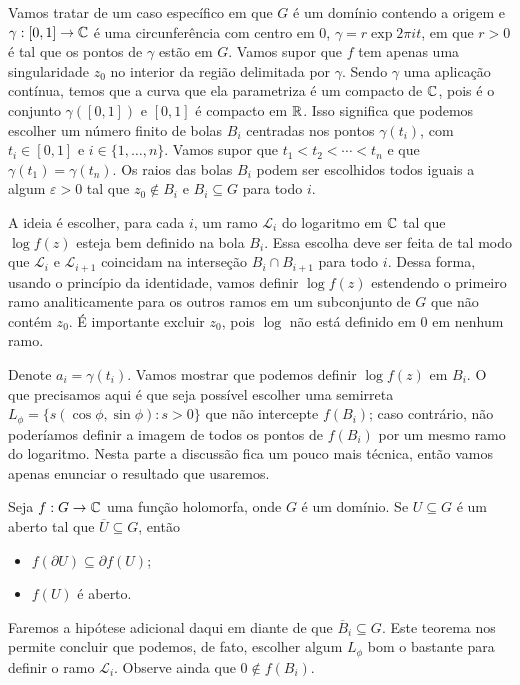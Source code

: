 Vamos tratar de um caso específico em que $G$ é um domínio contendo a origem e 
$\gamma: [0,1] \to \mathbb{C}$ é uma circunferência com centro em $0$, $\gamma = r\exp{2 \pi i t}$, 
em que $r > 0$ é tal que os pontos de $\gamma$ estão em $G$. Vamos supor que $f$ tem apenas 
uma singularidade $z_0$ no interior da região delimitada por $\gamma$. Sendo $\gamma$ uma
aplicação contínua, temos que a curva que ela parametriza é um compacto de $\mathbb{C}$, pois é o
conjunto $\gamma([0,1])$ e $[0,1]$ é compacto em $\mathbb{R}$. Isso significa que podemos escolher um
número finito de bolas $B_i$ centradas nos pontos $\gamma(t_i)$, com $t_i \in [0,1]$ e 
$i \in \{1,\dots, n\}$. Vamos supor que $t_1 < t_2 < \cdots < t_n$ e que 
$\gamma(t_1) = \gamma(t_n)$.  Os raios das bolas $B_i$ podem ser escolhidos todos iguais a
algum $\varepsilon > 0$ tal que $z_0 \not \in B_i$ e $B_i \subseteq G$ para todo $i$.

A ideia é escolher, para cada $i$, um ramo $\mathcal{L}_i$ do logaritmo em $\mathbb{C}$ tal que 
$\log f(z)$ esteja bem definido na bola $B_i$. Essa escolha deve ser feita de tal modo que
$\mathcal{L}_i$ e $\mathcal{L}_{i+1}$ coincidam na interseção $B_i \cap B_{i+1}$ para todo $i$.
Dessa forma, usando o princípio da identidade, vamos definir $\log f(z)$ estendendo o primeiro
ramo analiticamente para os outros ramos em um subconjunto de $G$ que não contém $z_0$. 
É importante excluir $z_0$, pois $\log$ não está definido em $0$ em nenhum ramo.

Denote $a_i = \gamma(t_i)$. Vamos mostrar que podemos definir $\log f(z)$ em $B_i$. 
O que precisamos aqui é que seja possível escolher uma semirreta 
$L_\phi = \{s(\cos \phi, \sin \phi): s > 0\}$ que não intercepte $f(B_i)$; caso contrário, 
não poderíamos definir a imagem de todos os pontos de $f(B_i)$ por um mesmo ramo do logaritmo.
Nesta parte a discussão fica um pouco mais técnica, então vamos apenas enunciar o resultado 
que usaremos. 
%
\begin{teorema}
    Seja $f: G \to \mathbb{C}$ uma função holomorfa, onde $G$ é um domínio. 
    Se $U \subseteq G$ é um aberto tal que $\overline{U} \subseteq G$, então
    \begin{itemize}
        \item $f(\partial U) \subseteq \partial f(U)$;
        \item $f(U)$ é aberto.
    \end{itemize}
\end{teorema}
%
Faremos a hipótese adicional daqui em diante de que $\overline{B}_i \subseteq G$. 
Este teorema nos permite concluir que podemos, de fato, escolher algum $L_\phi$ 
bom o bastante para definir o ramo $\mathcal{L}_i$. Observe ainda que $0 \not \in f(B_i)$.

